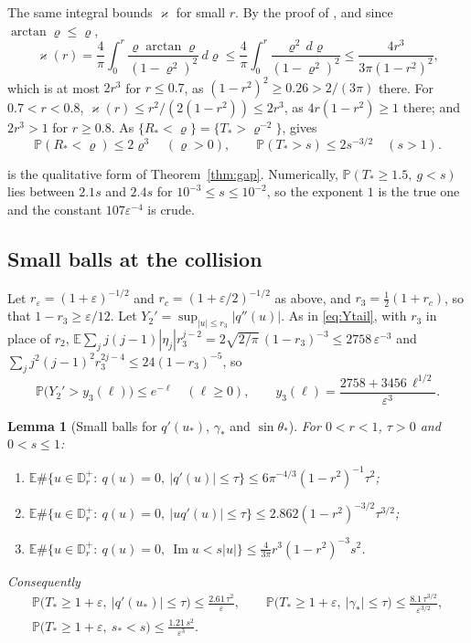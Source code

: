 \documentclass[11pt]{amsart}
\newtheorem{lemma}[theorem]{Lemma}
\theoremstyle{definition}
\theoremstyle{remark}
\numberwithin{equation}{section}
\newcommand{\D}{\mathbb{D}}
\newcommand{\E}{\mathbb{E}}
\newcommand{\PP}{\mathbb{P}}
\newcommand{\eps}{\varepsilon}
\DeclareMathOperator{\im}{Im}
\begin{document}
The same integral bounds $\varkappa$ for small $r$. By the proof of \cite[Lemma~\ref{M-lem:pairs}]{Main}, and since $\arctan\varrho\le\varrho$,
\[
\varkappa(r)=\frac4\pi\int_0^r\frac{\varrho\arctan\varrho}{(1-\varrho^2)^2}\,d\varrho\le\frac4\pi\int_0^r\frac{\varrho^2\,d\varrho}{(1-\varrho^2)^2}\le\frac{4r^3}{3\pi(1-r^2)^2},
\]
which is at most $2r^3$ for $r\le0.7$, as $(1-r^2)^2\ge0.26>2/(3\pi)$ there. For $0.7<r<0.8$, $\varkappa(r)\le r^2/(2(1-r^2))\le2r^3$, as $4r(1-r^2)\ge1$ there; and $2r^3>1$ for $r\ge0.8$. As $\{R_*<\varrho\}=\{T_*>\varrho^{-2}\}$, \cite[Lemma~\ref{M-lem:pairs}]{Main} gives
\begin{equation}\label{eq:Rsmall}
\PP(R_*<\varrho)\le2\varrho^3\quad(\varrho>0),\qquad\PP(T_*>s)\le2s^{-3/2}\quad(s>1).
\end{equation}

\cite[Lemma~\ref{M-lem:moduli}]{Main} is the qualitative form of Theorem~\ref{thm:gap}. Numerically, $\PP(T_*\ge1.5,\ g<s)$ lies between $2.1s$ and $2.4s$ for $10^{-3}\le s\le10^{-2}$, so the exponent $1$ is the true one and the constant $107\eps^{-4}$ is crude.

\subsection{Small balls at the collision}\label{subsec:smallballs}
Let $r_\eps=(1+\eps)^{-1/2}$ and $r_c=(1+\eps/2)^{-1/2}$ as above, and $r_3=\frac12(1+r_c)$, so that $1-r_3\ge\eps/12$. Let $Y_2'=\sup_{|u|\le r_3}|q''(u)|$. As in \eqref{eq:Ytail}, with $r_3$ in place of $r_2$, $\E\sum_jj(j-1)|\eta_j|r_3^{j-2}=2\sqrt{2/\pi}\,(1-r_3)^{-3}\le2758\,\eps^{-3}$ and $\sum_jj^2(j-1)^2r_3^{2j-4}\le24(1-r_3)^{-5}$, so
\begin{equation}\label{eq:Y3tail}
\PP\bigl(Y_2'>y_3(\ell)\bigr)\le e^{-\ell}\quad(\ell\ge0),\qquad y_3(\ell)=\frac{2758+3456\,\ell^{1/2}}{\eps^3}.
\end{equation}

\begin{lemma}[Small balls for $q'(u_*)$, $\gamma_*$ and $\sin\theta_*$]\label{lem:collision-smallball}
For $0<r<1$, $\tau>0$ and $0<s\le1$:
\begin{enumerate}
\item[(a)] $\E\#\{u\in\D_r^+:\ q(u)=0,\ |q'(u)|\le\tau\}\le6\pi^{-4/3}(1-r^2)^{-1}\tau^2$;
\item[(b)] $\E\#\{u\in\D_r^+:\ q(u)=0,\ |uq'(u)|\le\tau\}\le2.862(1-r^2)^{-3/2}\tau^{3/2}$;
\item[(c)] $\E\#\{u\in\D_r^+:\ q(u)=0,\ \im u<s|u|\}\le\frac4{3\pi}r^3(1-r^2)^{-3}s^2$.
\end{enumerate}
Consequently
\begin{gather*}
\PP\bigl(T_*\ge1+\eps,\ |q'(u_*)|\le\tau\bigr)\le\frac{2.61\,\tau^2}\eps,\qquad\PP\bigl(T_*\ge1+\eps,\ |\gamma_*|\le\tau\bigr)\le\frac{8.1\,\tau^{3/2}}{\eps^{3/2}},\\
\PP\bigl(T_*\ge1+\eps,\ s_*<s\bigr)\le\frac{1.21\,s^2}{\eps^3}.
\end{gather*}
\end{lemma}
\end{document}
